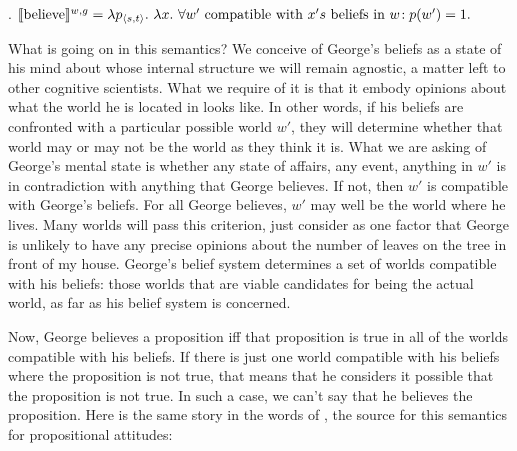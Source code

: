 \ex. $\sv{\mbox{believe}}^{w,g} =\\
\null\hfill\lambda p_{\angles{s,t}}.\ \lambda x. \ \forall w' \mbox{ compatible with } x's \mbox{ beliefs in } w\!: p(w') = 1.$

What %
%
is going on in this semantics? We conceive of George's beliefs as a
state of his mind about whose internal structure we will remain
agnostic, a matter left to other cognitive scientists. What we require
of it is that it embody opinions about what the world he is located in
looks like. In other words, if his beliefs are confronted with a
particular possible world $w'$, they will determine whether that world
may or may not be the world as they think it is. What we are asking of
George's mental state is whether any state of affairs, any event,
anything in $w'$ is in contradiction with anything that George
believes. If not, then $w'$ is compatible with George's beliefs. For
all George believes, $w'$ may well be the world where he lives. Many
worlds will pass this criterion, just consider as one factor that
George is unlikely to have any precise opinions about the number of
leaves on the tree in front of my house. George's belief system
determines a set of worlds compatible with his beliefs: those worlds
that are viable candidates for being the actual world, as far as his
belief system is concerned.

Now, George believes a proposition iff that proposition is true in all
of the worlds compatible with his beliefs. If there is just one world
compatible with his beliefs where the proposition is not true, that
means that he considers it possible that the proposition is not true.
In such a case, we can't say that he believes the proposition. Here is
the same story in the words of \citet{hintikka:1969:attitudes}, the
source for this semantics for propositional attitudes:


